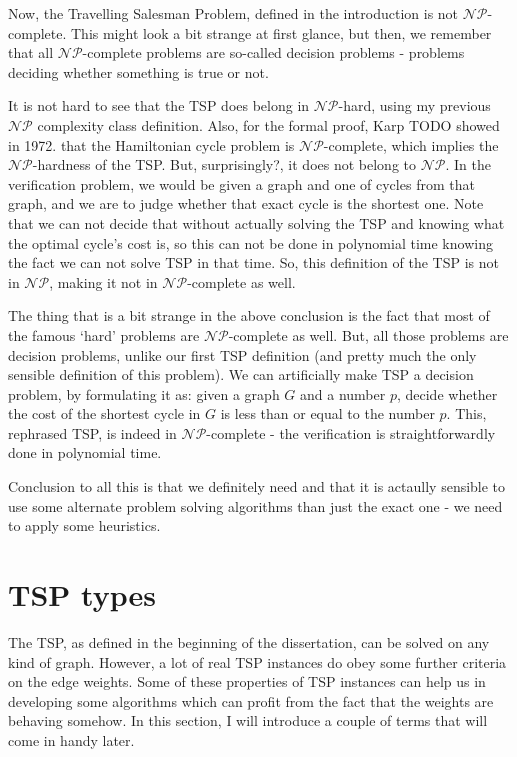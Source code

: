 \documentclass[12pt,twoside,notitlepage]{report}
\begin{document}
Now, the Travelling Salesman Problem, defined in the introduction is not $\mathcal{NP}$-complete. This might look a bit strange at first glance, but then, we remember that all $\mathcal{NP}$-complete problems are so-called decision problems - problems deciding whether something is true or not.

\smallskip 

It is not hard to see that the TSP does belong in $\mathcal{NP}$-hard, using my previous $\mathcal{NP}$ complexity class definition. Also, for the formal proof, Karp TODO showed in 1972. that the Hamiltonian cycle problem is $\mathcal{NP}$-complete, which implies the $\mathcal{NP}$-hardness of the TSP. But, surprisingly?, it does not belong to $\mathcal{NP}$. In the verification problem, we would be given a graph and one of cycles from that graph, and we are to judge whether that exact cycle is the shortest one. Note that we can not decide that without actually solving the TSP and knowing what the optimal cycle's cost is, so this can not be done in polynomial time knowing the fact we can not solve TSP in that time. So, this definition of the TSP is not in $\mathcal{NP}$, making it not in $\mathcal{NP}$-complete as well.

\smallskip 

The thing that is a bit strange in the above conclusion is the fact that most of the famous `hard' problems are $\mathcal{NP}$-complete as well. But, all those problems are decision problems, unlike our first TSP definition (and pretty much the only sensible definition of this problem). We can artificially make TSP a decision problem, by formulating it as: given a graph $G$ and a number $p$, decide whether the cost of the shortest cycle in $G$ is less than or equal to the number $p$. This, rephrased TSP, is indeed in $\mathcal{NP}$-complete - the verification is straightforwardly done in polynomial time.

\medskip

Conclusion to all this is that we definitely need and that it is actaully sensible to use some alternate problem solving algorithms than just the exact one - we need to apply some heuristics. 

\section{TSP types}

The TSP, as defined in the beginning of the dissertation, can be solved on any kind of graph. However, a lot of real TSP instances do obey some further criteria on the edge weights. Some of these properties of TSP instances can help us in developing some algorithms which can profit from the fact that the weights are behaving somehow. In this section, I will introduce a couple of terms that will come in handy later.
\end{document}
